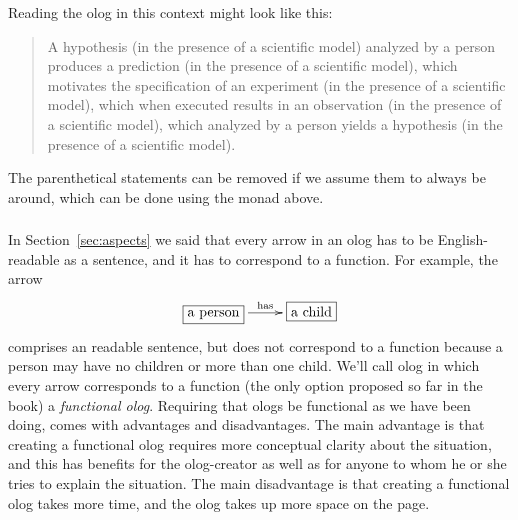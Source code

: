 \documentclass[CT4S-EN-RU]{subfiles}
\begin{document}
\begin{exampleENG}
Reading the olog in this context might look like this:

\begin{quote}
A hypothesis (in the presence of a scientific model) analyzed by a person produces a prediction (in the presence of a scientific model), which motivates the specification of an experiment (in the presence of a scientific model), which when executed results in an observation (in the presence of a scientific model), which analyzed by a person yields a hypothesis (in the presence of a scientific model).
\end{quote}

The parenthetical statements can be removed if we assume them to always be around, which can be done using the monad above.
\end{exampleENG}

\begin{exampleRUS}\label{ex:scientific method}
\end{exampleRUS}


\subsubsection{}\label{sec:relaxing ologs}

\begin{blockENG}
In Section~\ref{sec:aspects} we said that every arrow in an olog has to be English-readable as a sentence, and it has to correspond to a function. For example, the arrow 
\begin{align}\label{dia:non-functional but english}
\xymatrix{\fbox{a person}\LA{r}{has}&\fbox{a child}}
\end{align}
comprises an readable sentence, but does not correspond to a function because a person may have no children or more than one child. 
We'll call olog in which every arrow corresponds to a function (the only option proposed so far in the book) a {\em functional olog}. Requiring that ologs be functional as we have been doing, comes with advantages and disadvantages. The main advantage is that creating a functional olog requires more conceptual clarity about the situation, and this has benefits for the olog-creator as well as for anyone to whom he or she tries to explain the situation. The main disadvantage is that creating a functional olog takes more time, and the olog takes up more space on the page.
\end{blockENG}
\end{document}
